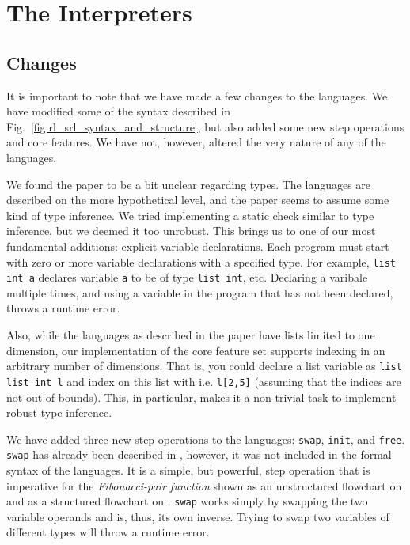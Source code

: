 
\section{The Interpreters}

\subsection{Changes}\label{sec:changes}

It is important to note that we have made a few changes to the languages. We have modified some of the syntax described in Fig.~\ref{fig:rl_srl_syntax_and_structure}, but also added some new step operations and core features. We have not, however, altered the very nature of any of the languages.

We found the paper\cite{REV} to be a bit unclear regarding types. The languages are described on the more hypothetical level, and the paper seems to assume some kind of type inference. We tried implementing a static check similar to type inference, but we deemed it too unrobust. This brings us to one of our most fundamental additions: explicit variable declarations. Each program must start with zero or more variable declarations with a specified type. For example, \texttt{list int a} declares variable \texttt{a} to be of type \texttt{list int}, etc. Declaring a varibale multiple times, and using a variable in the program that has not been declared, throws a runtime error.

Also, while the languages as described in the paper have lists limited to one dimension, our implementation of the core feature set supports indexing in an arbitrary number of dimensions. That is, you could declare a list variable as \texttt{list list int l} and index on this list with i.e. \texttt{l[2,5]} (assuming that the indices are not out of bounds). This, in particular, makes it a non-trivial task to implement robust type inference.

We have added three new step operations to the languages: \texttt{swap}, \texttt{init}, and \texttt{free}. \texttt{swap} has already been described in \cite[p.~99]{REV}, however, it was not included in the formal syntax of the languages. It is a simple, but powerful, step operation that is imperative for the \textit{Fibonacci-pair function} shown as an unstructured flowchart on \cite[p.~99]{REV} and as a structured flowchart on \cite[p.~93]{REV}. \texttt{swap} works simply by swapping the two variable operands and is, thus, its own inverse. Trying to swap two variables of different types will throw a runtime error.

